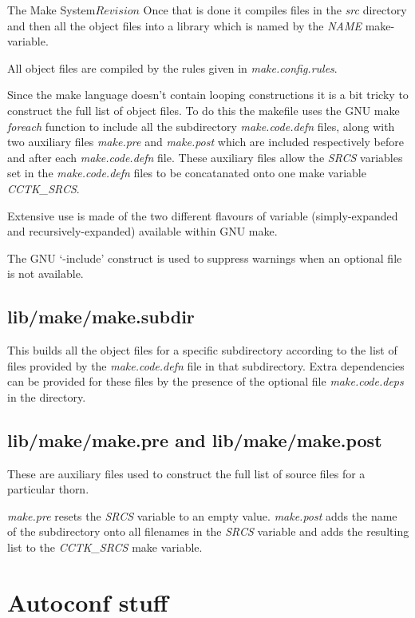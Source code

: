 \begin{cactuspart}{3}{The Make System}{}{$Revision$}
Once that is done it compiles files in the {\em src} directory and then all
the object files into a library which is named by the {\em NAME} make-variable.

All object files are compiled by the rules given in {\em make.config.rules}.

Since the make language doesn't contain looping constructions it is a bit tricky
to construct the full list of object files.  To do this the makefile uses
the GNU make {\em foreach} function to include all the subdirectory 
{\em make.code.defn} files, along with two auxiliary files {\em make.pre} and
{\em make.post} which are included respectively before and after each 
{\em make.code.defn} file.  These auxiliary files allow the {\em SRCS} variables set in
the {\em make.code.defn} files to be concatanated onto one make variable 
{\em CCTK\_SRCS}.

Extensive use is made of the two different flavours of variable (simply-expanded and 
recursively-expanded) available within GNU make.

The GNU `-include' construct is used to suppress warnings when an optional file is
not available.

\section{lib/make/make.subdir}
\label{sec:makefiles:subdir}

This builds all the object files for a specific subdirectory according
to the list of files provided by the {\em make.code.defn} file
in that subdirectory.  Extra dependencies can be provided for these 
files by the presence of the optional file {\em make.code.deps} in the
directory.

\section{lib/make/make.pre and lib/make/make.post}
\label{sec:makefiles:prepost}

These are auxiliary files used to construct the full list of source
files for a particular thorn.

{\em make.pre} resets the {\em SRCS} variable to an empty value.  
{\em make.post} adds the name of the subdirectory onto all filenames
in the {\em SRCS} variable and adds the resulting list to the 
{\em CCTK\_SRCS} make variable.

\chapter{Autoconf stuff}
\label{ch:autoconf}


\end{cactuspart}
